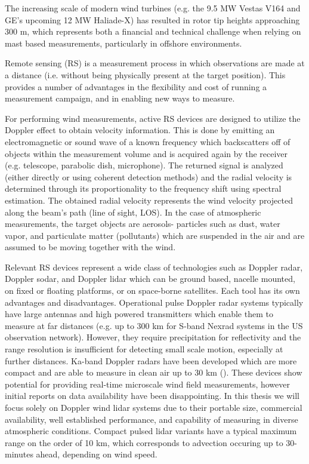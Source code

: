 The increasing scale of modern wind turbines (e.g. the 9.5 MW Vestas V164 and GE's upcoming 12 MW Haliade-X) has resulted in rotor tip heights approaching 300 m, which represents both a financial and technical challenge when relying on mast based measurements, particularly in offshore environments.

Remote sensing (RS) is a measurement process in which observations are made at a distance (i.e. without being physically present at the target position). This provides a number of advantages in the flexibility and cost of running a measurement campaign, and in enabling new ways to measure.

For performing wind measurements, active RS devices are designed to utilize the Doppler effect to obtain velocity information. This is done by emitting an electromagnetic or sound wave of a known frequency which backscatters off of objects within the measurement volume and is acquired again by the receiver (e.g. telescope, parabolic dish, microphone). The returned signal is analyzed (either directly or using coherent detection methods) and the radial velocity is determined through its proportionality to the frequency shift using spectral estimation. The obtained radial velocity represents the wind velocity projected along the beam's path (line of sight, LOS). In the case of atmospheric measurements, the target objects are aerosols- particles such as dust, water vapor, and particulate matter (pollutants) which are suspended in the air and are assumed to be moving together with the wind.


Relevant RS devices represent a wide class of technologies such as Doppler radar, Doppler sodar, and Doppler lidar which can be ground based, nacelle mounted, on fixed or floating platforms, or on space-borne satellites. Each tool has its own advantages and disadvantages. Operational pulse Doppler radar systems typically have large antennas and high powered transmitters which enable them to measure at far distances (e.g. up to 300 km for S-band Nexrad systems in the US observation network). However, they require precipitation for reflectivity and the range resolution is insufficient for detecting small scale motion, especially at further distances. Ka-band Doppler radars have been developed which are more compact and are able to measure in clean air up to 30 km (\cite{hirth_measuring_2012}). These devices show potential for providing real-time microscale wind field measurements, however initial reports on data availability have been disappointing. In this thesis we will focus solely on Doppler wind lidar systems due to their portable size, commercial availability, well established performance, and capability of measuring in diverse atmospheric conditions. Compact pulsed lidar variants have a typical maximum range on the order of 10 km, which corresponds to advection occuring up to 30-minutes ahead, depending on wind speed.


